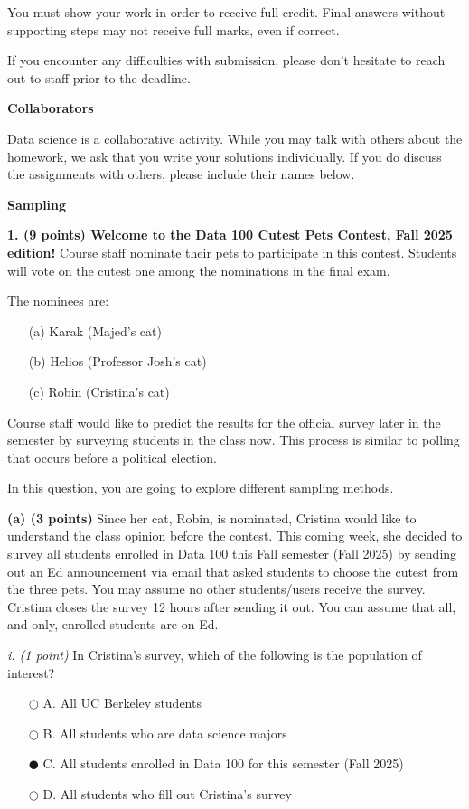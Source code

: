\documentclass[11pt]{article}
\begin{document}
\medskip
You must show your work in order to receive full credit. Final answers without supporting steps may not receive full marks, even if correct.

\medskip
If you encounter any difficulties with submission, please don’t hesitate to reach out to staff prior to the deadline.

\bigskip

\noindent \textbf{Collaborators}

\medskip
Data science is a collaborative activity. While you may talk with others about the homework, we ask that you write your solutions individually. If you do discuss the assignments with others, please include their names below.

\newpage

\noindent \textbf{\LARGE Sampling}

\medskip
\noindent \textbf{1. (9 points) Welcome to the Data 100 Cutest Pets Contest, Fall 2025 edition!} Course staff nominate their pets to participate in this contest. Students will vote on the cutest one among the nominations in the final exam.

\medskip
The nominees are:
\begin{itemize} [leftmargin=4em]
    \item[(a)] Karak (Majed’s cat)
    \item[(b)] Helios (Professor Josh’s cat)
    \item[(c)] Robin (Cristina’s cat)
\end{itemize}

Course staff would like to predict the results for the official survey later in the semester by surveying students in the class now. This process is similar to polling that occurs before a political election.

\medskip
In this question, you are going to explore different sampling methods.

\medskip
\textbf{(a) (3 points)} Since her cat, Robin, is nominated, Cristina would like to understand the class opinion before the contest. This coming week, she decided to survey all students enrolled in Data 100 this Fall semester (Fall 2025) by sending out an Ed announcement via email that asked students to choose the cutest from the three pets. You may assume no other students/users receive the survey. Cristina closes the survey 12 hours after sending it out. You can assume that all, and only, enrolled students are on Ed.

\smallskip
\textit{i. (1 point)} In Cristina’s survey, which of the following is the population of interest?
\begin{itemize} [leftmargin=4em]
    \item[$\bigcirc$] A. All UC Berkeley students
    \item[$\bigcirc$] B. All students who are data science majors
    \item[$\mdlgblkcircle$] C. All students enrolled in Data 100 for this semester (Fall 2025)
    \item[$\bigcirc$] D. All students who fill out Cristina’s survey
\end{itemize}
\end{document}
